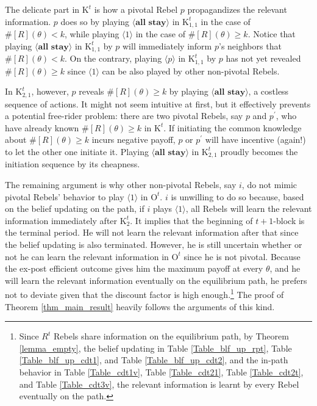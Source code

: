 \documentclass[12pt,letter]{article}
\newcommand{\Kappa}{\mathrm{K}}
\newcommand{\Omicron}{\mathrm{O}}
\theoremstyle{definition}
\theoremstyle{remark}
\theoremstyle{claim}
\begin{document}
\clearpage

The delicate part in $\Kappa^t$ is how a pivotal Rebel $p$ propagandizes the relevant information. $p$ does so by playing $\langle \textbf{all stay} \rangle$ in $\Kappa^{t}_{1,1}$ in the case of $\#[R](\theta)< k$, while playing $\langle 1 \rangle$ in the case of $\#[R](\theta)\geq k$. Notice that playing $\langle \textbf{all stay} \rangle$ in $\Kappa^{t}_{1,1}$ by $p$ will immediately inform $p$'s neighbors that $\#[R](\theta)< k$. On the contrary, playing $\langle p \rangle$ in $\Kappa^{t}_{1,1}$ by $p$ has not yet revealed $\#[R](\theta)\geq k$ since $\langle 1 \rangle$ can be also played by other non-pivotal Rebels. 

In $\Kappa^{t}_{2,1}$, however, $p$ reveals $\#[R](\theta)\geq k$ by playing $\langle \textbf{all stay} \rangle$, a costless sequence of actions. It might not seem intuitive at first, but it effectively prevents a potential free-rider problem: there are two pivotal Rebels, say $p$ and $p^{'}$, who have already known $\#[R](\theta)\geq k$ in $\Kappa^t$. If initiating the common knowledge about $\#[R](\theta)\geq k$ incurs negative payoff, $p$ or $p^{'}$ will have incentive (again!) to let the other one initiate it. Playing $\langle \textbf{all stay} \rangle$ in $\Kappa^t_{2,1}$ proudly becomes the initiation sequence by its cheapness.

The remaining argument is why other non-pivotal Rebels, say $i$, do not mimic pivotal Rebels' behavior to play $\langle 1 \rangle$ in $\Omicron^t$. $i$ is unwilling to do so because, based on the belief updating on the path, if $i$ plays $\langle 1 \rangle$, all Rebels will learn the relevant information immediately after $\Kappa^t_2$. It implies that the beginning of $t+1$-block is the terminal period. He will not learn the relevant information after that since the belief updating is also terminated. However, he is still uncertain whether or not he can learn the relevant information in $\Omicron^t$ since he is not pivotal. Because the ex-post efficient outcome gives him the maximum payoff at every $\theta$, and he will learn the relevant information eventually on the equilibrium path, he prefers not to deviate given that the discount factor is high enough.\footnote{Since $R^t$ Rebels share information on the equilibrium path, by Theorem \ref{lemma_empty}, the belief updating in Table \ref{Table_blf_up_rpt}, Table \ref{Table_blf_up_cdt1}, and Table \ref{Table_blf_up_cdt2}, and the in-path behavior in Table \ref{Table_cdt1v}, Table \ref{Table_cdt21}, Table \ref{Table_cdt2t}, and Table \ref{Table_cdt3v}, the relevant information is learnt by every Rebel eventually on the path.} 
The proof of Theorem \ref{thm_main_result} heavily follows the arguments of this kind.
\end{document}
